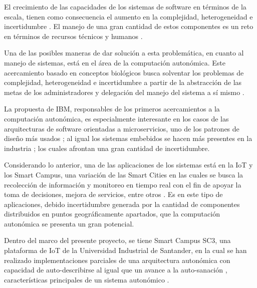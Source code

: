 \documentclass[12pt]{article}
\begin{document}

    El crecimiento de las capacidades de los sistemas de software en términos de la escala, tienen como consecuencia el aumento en la complejidad, heterogeneidad e incertidumbre \cite{emerging_2005}. El manejo de una gran cantidad de estos componentes es un reto en términos de recursos técnicos y humanos \cite[pp.~4-5]{horn_2001}. 
    
    Una de las posibles maneras de dar solución a esta problemática, en cuanto al manejo de sistemas, está en el área de la computación autonómica. Este acercamiento basado en conceptos biológicos busca solventar los problemas de complejidad, heterogeneidad e incertidumbre \cite{emerging_2005} a partir de la abstracción de las metas de los administradores y delegación del manejo del sistema a sí mismo \cite{lalanda_diaconescu_mccann_2014}.
    
    La propuesta de IBM, responsables de los primeros acercamientos a la computación autonómica, es especialmente interesante en los casos de las arquitecturas de software orientadas a microservicios, uno de los patrones de diseño más usados \cite{forrester_research_2019}; al igual los sistemas embebidos se hacen más presentes en la industria \cite{deichmann_2022}; los cuales afrontan una gran cantidad de incertidumbre. 
    
    Considerando lo anterior, una de las aplicaciones de los sistemas está en la IoT y los Smart Campus, una variación de las Smart Cities en las cuales se busca la recolección de información y monitoreo en tiempo real con el fin de apoyar la toma de decisiones, mejora de servicios, entre otros \cite{MinAllah2020}. Es en este tipo de aplicaciones, debido incertidumbre generada por la cantidad de componentes distribuidos en puntos geográficamente apartados, que la computación autonómica se presenta un gran potencial. 

    Dentro del marco del presente proyecto, se tiene Smart Campus SC3, una plataforma de IoT de la Universidad Industrial de Santander, en la cual se han realizado implementaciones parciales de una arquitectura autonómica con capacidad de auto-describirse al igual que un avance a la auto-sanación \cite{henry_2020}, características principales de un sistema autonómico \cite{horn_2001}. 
    
\end{document}

